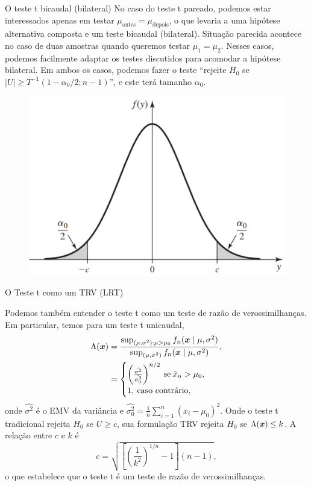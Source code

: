 \begin{frame}{O teste t bicaudal (bilateral)}
No caso do  teste t pareado, podemos estar interessados apenas em testar $\mu_{\text{antes}}= \mu_{\text{depois}}$, o que levaria a uma hipótese alternativa composta e um teste bicaudal (bilateral).
Situação parecida acontece no caso de duas amostras quando queremos testar $\mu_1 = \mu_2$.
Nesses casos, podemos facilmente adaptar os testes discutidos para acomodar a hipótese bilateral.
Em ambos os casos, podemos fazer o teste ``rejeite $H_0$ se $|U|\geq T^{-1}(1-\alpha_0/2; n-1)$'', e este terá tamanho $\alpha_0$.
\begin{figure}
 \begin{center}
  \includegraphics[scale=0.3]{figures/bilateral.pdf}
 \end{center}
\end{figure}
\end{frame}

\begin{frame}{O Teste t como um TRV (LRT)}

Podemos também entender o teste t como um teste de razão de verossimilhanças.
Em particular, temos para um teste t unicaudal, 
\begin{align*}
 \Lambda(\boldsymbol{x}) &= \frac{\sup_{(\mu, \sigma^2):\mu > \mu_0} f_n(\boldsymbol{x} \mid \mu, \sigma^2) }{\sup_{(\mu, \sigma^2)} f_n(\boldsymbol{x} \mid \mu, \sigma^2)}, \\
 &=  \begin{cases}
     \left(\frac{\hat{\sigma^2}}{\hat{\sigma_0^2}}\right)^{n/2} \: \text{se} \: \bar{x}_n> \mu_0,\\
     1,\:\text{caso contrário},
\end{cases} 
\end{align*}
onde $\hat{\sigma^2}$ é o EMV da variância e $\hat{\sigma_0^2} = \frac{1}{n}\sum_{i=1}^n (x_i-\mu_0)^2$.
Onde o teste t tradicional rejeita $H_0$ se $U\geq c$, sua formulação TRV rejeita $H_0$ se $\Lambda(\boldsymbol{x}) \leq k$.
A relação entre $c$ e $k$ é 
\begin{equation*}
 c = \sqrt{\left[\left(\frac{1}{k^2}\right)^{1/n} - 1 \right](n-1)}, 
\end{equation*}
o que estabelece que o teste t é um teste de razão de verossimilhanças.
\end{frame}

